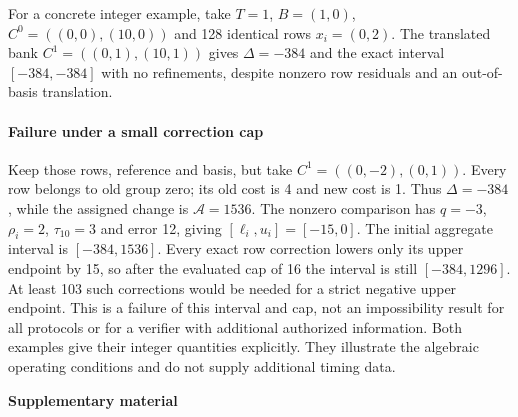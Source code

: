 \documentclass[5p,times,twocolumn]{elsarticle}
\begin{document}
For a concrete integer example, take $T=1$, $B=(1,0)$,
$C^0=((0,0),(10,0))$ and 128 identical rows $x_i=(0,2)$.
The translated bank $C^1=((0,1),(10,1))$ gives $\Delta=-384$ and the
exact interval $[-384,-384]$ with no refinements, despite nonzero row
residuals and an out-of-basis translation.

\paragraph{Failure under a small correction cap}
Keep those rows, reference and basis, but take
$C^1=((0,-2),(0,1))$. Every row belongs to old group zero; its old cost
is 4 and new cost is 1. Thus $\Delta=-384$, while the assigned change is
$\mathcal A=1536$. The nonzero comparison has
$q=-3$, $\rho_i=2$, $\tau_{10}=3$ and error 12, giving
$[\ell_i,u_i]=[-15,0]$. The initial aggregate interval is
$[-384,1536]$. Every exact row correction lowers only its upper endpoint
by 15, so after the evaluated cap of 16 the interval is still
$[-384,1296]$. At least 103 such corrections would be needed for a strict
negative upper endpoint. This is a failure of this interval and cap, not
an impossibility result for all protocols or for a verifier with additional
authorized information. Both examples give their integer quantities
explicitly. They illustrate the algebraic operating conditions and do not
supply additional timing data.

\clearpage
\onecolumn
\setcounter{page}{1}
\renewcommand{\thepage}{S\arabic{page}}
\setcounter{table}{0}
\renewcommand{\thetable}{S\arabic{table}}
\renewcommand{\theHtable}{supp.\arabic{table}}
\begin{center}{\Large\bfseries Supplementary material}\end{center}
\end{document}
